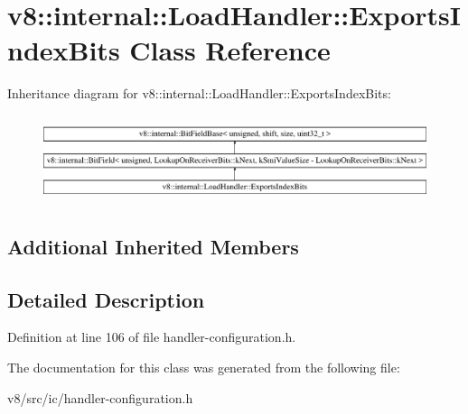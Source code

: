 \hypertarget{classv8_1_1internal_1_1LoadHandler_1_1ExportsIndexBits}{}\section{v8\+:\+:internal\+:\+:Load\+Handler\+:\+:Exports\+Index\+Bits Class Reference}
\label{classv8_1_1internal_1_1LoadHandler_1_1ExportsIndexBits}
Inheritance diagram for v8\+:\+:internal\+:\+:Load\+Handler\+:\+:Exports\+Index\+Bits\+:\begin{figure}[H]
\begin{center}
\leavevmode
\includegraphics[height=2.564885cm]{classv8_1_1internal_1_1LoadHandler_1_1ExportsIndexBits}
\end{center}
\end{figure}
\subsection*{Additional Inherited Members}


\subsection{Detailed Description}


Definition at line 106 of file handler-\/configuration.\+h.



The documentation for this class was generated from the following file\+:\begin{DoxyCompactItemize}
\item 
v8/src/ic/handler-\/configuration.\+h\end{DoxyCompactItemize}
